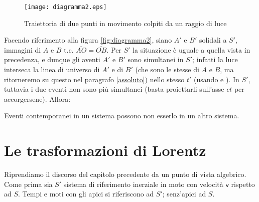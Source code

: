 \begin{figure}[htbp]
  \begin{center}
      
      
      
    \texttt{[image: diagramma2.eps]}
    \caption{Traiettoria di due punti in movimento colpiti da un
      raggio di luce} \label{fig:diagramma2}
  \end{center}
\end{figure}
Facendo riferimento alla figura \vref{fig:diagramma2}, siano $A'$ e $
B' $ solidali a $ S' $, immagini di $A$ e $B$ t.c. $ \overline{ AO } =
\overline{ OB } $.  Per $ S' $ la situazione \`e uguale a quella vista
in precedenza, e dunque gli aventi $ A' $ e $ B' $ sono simultanei in
$ S' $; infatti la luce interseca la linea di universo di $ A' $ e di
$ B' $ (che sono le stesse di $ A $ e $ B $, ma ritorneremo su questo
nel paragrafo \vref{assoluto}) nello stesso $ t' $ (usando 
e ). In $ S' $, tuttavia i due eventi non sono pi\`u
simultanei (basta proiettarli sull'asse $ ct $ per
accorgersene). Allora:
\begin{osservazione}
  Eventi contemporanei in un sistema possono non esserlo in un altro
  sistema.
\end{osservazione}
\section{Le trasformazioni di Lorentz}
Riprendiamo il discorso del capitolo precedente da un punto di vista
algebrico. Come prima sia $S'$ sistema di riferimento inerziale in
moto con velocit\`a $\mathbf{\mathsf{v}}$ rispetto ad $S$. Tempi e
moti con gli apici si riferiscono ad $S'$; senz'apici ad $S$.


